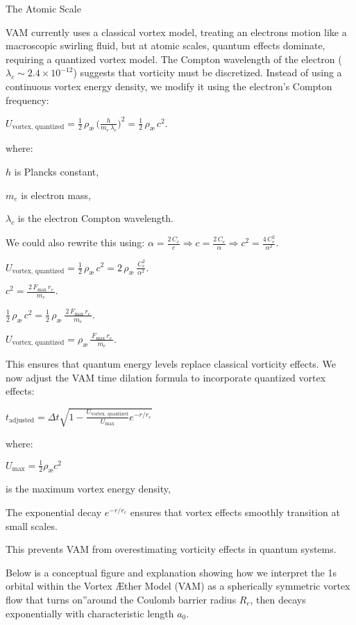 The Atomic Scale

VAM currently uses a classical vortex model, treating an electron\rqs s motion like a macroscopic swirling fluid, but at atomic scales, quantum effects dominate, requiring a quantized vortex model. The Compton wavelength of the electron ($\lambda_c \sim 2.4 \times 10^{-12}$) suggests that vorticity must be discretized. Instead of using a continuous vortex energy density, we modify it using the electron's Compton frequency:

$U_\text{vortex, quantized}= \tfrac12\,\rho_\text{\ae}\,\bigl(\tfrac{h}{m_e\,\lambda_c}\bigr)^2= \tfrac12\,\rho_\text{\ae}\,c^2.$

where:

$h$ is Planck\rqs s constant,

$m_e$ is electron mass,

$\lambda_c$ is the electron Compton wavelength.

We could also rewrite this using: 
$\alpha= \tfrac{2\,C_e}{c}\Rightarrow c= \tfrac{2\,C_e}{\alpha}\Rightarrow c^2= \tfrac{4\,C_e^{2}}{\alpha^{2}}.$

$U_\text{vortex, quantized}= \tfrac12\,\rho_\text{\ae}\,c^2= 2\,\rho_\text{\ae}\,\frac{\,C_e^{2}}{\alpha^{2}}.$

$c^2= \frac{\,2\,F_{\max}\,r_c\,}{\,m_{e}\,}.$

$ \tfrac12\,\rho_\text{\ae}\,c^2= \tfrac12\,\rho_\text{\ae}\,\frac{\,2\,F_{\max}\,r_c\,}{\,m_{e}\,}.$

$U_\text{vortex, quantized}= \rho_\text{\ae}\,\frac{\,F_{\max}\,r_c\,}{\,m_{e}\,}.$

This ensures that quantum energy levels replace classical vorticity effects. We now adjust the VAM time dilation formula to incorporate quantized vortex effects:

$\boxed{t_\text{adjusted} = \Delta t \sqrt{1 - \frac{U_\text{vortex, quantized}}{U_\text{max}} e^{-r/r_c}}}$

where:

$U_\text{max} = \frac{1}{2} \rho_\text{\ae} c^2$

is the maximum vortex energy density,

The exponential decay $e^{-r/r_c}$ ensures that vortex effects smoothly transition at small scales.

This prevents VAM from overestimating vorticity effects in quantum systems.

Below is a conceptual figure and explanation showing how we interpret the 1s orbital within the Vortex Æther Model (VAM) as a spherically symmetric vortex flow that \grqq turns on\textquotedblright around the Coulomb barrier radius \(R_c\), then decays exponentially with characteristic length \(a_0\).





